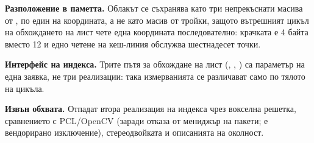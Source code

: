 \textbf{Разположение в паметта.} Облакът се съхранява като три непрекъснати масива от
, по един на координата, а не като масив от тройки, защото вътрешният цикъл на
обхождането на лист чете една координата последователно: крачката е 4 байта вместо 12 и едно
четене на кеш-линия обслужва шестнадесет точки.

\textbf{Интерфейс на индекса.} Трите пътя за обхождане на лист (,
, ) са параметър на една заявка, не три реализации: така
измерванията се различават само по тялото на цикъла.

\textbf{Извън обхвата.} Отпадат втора реализация на индекса чрез вокселна решетка,
сравнението с PCL/OpenCV (заради отказа от мениджър на пакети;  е
вендорирано изключение), стереодвойката и описанията на околност.
